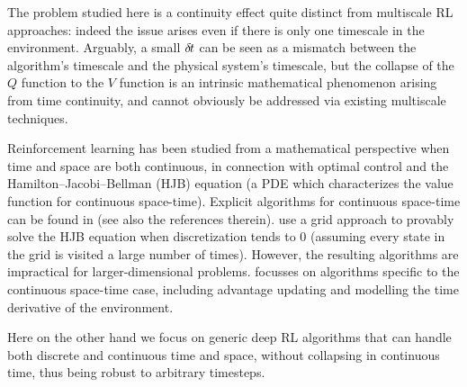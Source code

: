 
The problem studied here is a continuity effect quite distinct from
multiscale RL approaches: indeed the issue arises even if there
is only one timescale in the environment. Arguably, a small
${\delta\hspace{-.1em}t}$ can be seen as a mismatch between the algorithm's
timescale and the physical system's timescale, but the collapse of the
$Q$ function to the $V$ function is an intrinsic mathematical phenomenon arising from time
continuity, and cannot obviously be addressed via existing multiscale
techniques. 

Reinforcement learning has been studied from a mathematical perspective
when time and space are both continuous, in connection with optimal
control and the Hamilton--Jacobi--Bellman (HJB) equation (a PDE which
characterizes the value function for continuous space-time). Explicit
algorithms for continuous
space-time can be found in
\cite{cont_rl,MunosBourgines98} (see also the references therein).
\cite{MunosBourgines98} use a grid approach to provably solve the HJB
equation when discretization tends to $0$ (assuming every state in the
grid is visited a large number of times). However,
the resulting algorithms are
impractical \cite{cont_rl} for larger-dimensional problems.
\cite{cont_rl} focusses on algorithms specific to the continuous
space-time case, including advantage updating and modelling
the time derivative of the environment.

Here on the other hand we focus on generic deep RL algorithms that can handle
both discrete and continuous time and space, without collapsing in
continuous time, thus being robust to arbitrary timesteps.


